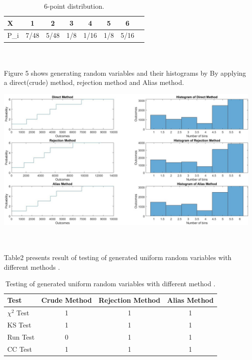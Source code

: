 \begin{table}[h!]
\centering
\caption{6-point distribution.}
\label{summstats}
\begin{tabular}{|l|c|c|c|c|c|c|c|}
\hline
    X & 1 & 2 & 3 & 4 & 5 & 6  \\ \hline
    P_i & 7/48 & 5/48 & 1/8 & 1/16& 1/8 & 5/16 \\  \hline
\end{tabular}
\end{table}\\
\\
Figure 5 shows generating random variables and their histograms by By applying a direct(crude) method, rejection method and Alias method.\\
\begin{center}
    \includegraphics[scale=0.3]{Figures/figure2_2.jpg}\\
\end{center}\\
\\Table2 presents result of  testing of generated uniform random variables with different methods .
\begin{table}[h!]
\centering
\caption{Testing of generated uniform random variables with different method .}
\label{summstats}
\begin{tabular}{|l|c|c|c|}
\hline
\textbf{Test}  & \multicolumn{1}{l|}{\textbf{Crude Method}} & \multicolumn{1}{l|}{\textbf{Rejection Method}}& \multicolumn{1}{l|}{\textbf{Alias Method}} \\ \hline

    $\chi^2$ Test & 1 & 1 & 1  \\ \hline
    KS Test & 1 & 1 & 1 \\  \hline
    Run Test & 0 & 1 & 1  \\ \hline
    CC Test & 1 & 1 & 1 \\  \hline
\end{tabular}
\end{table}\\
\\



